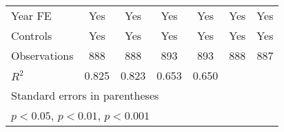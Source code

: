 \begin{table}[htbp]
\begin{tabular}{l*{6}{c}}
\addlinespace
Year FE         &      Yes         &      Yes         &      Yes         &      Yes         &      Yes         &      Yes         \\
\addlinespace
Controls        &      Yes         &      Yes         &      Yes         &      Yes         &      Yes         &      Yes         \\
\midrule
Observations    &      888         &      888         &      893         &      893         &      888         &      887         \\
\(R^{2}\)       &    0.825         &    0.823         &    0.653         &    0.650         &                  &                  \\
\bottomrule
\multicolumn{7}{l}{\footnotesize Standard errors in parentheses}\\
\multicolumn{7}{l}{\footnotesize \sym{*} \(p<0.05\), \sym{**} \(p<0.01\), \sym{***} \(p<0.001\)}\\
\end{tabular}
\end{table}
